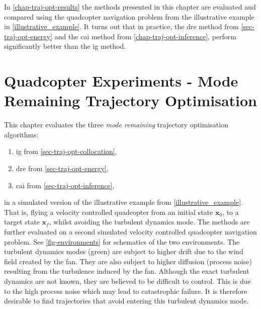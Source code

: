\documentclass{mimosis-class/mimosis}
\numberwithin{equation}{chapter}
\newcommand{\state}{\ensuremath{\mathbf{x}}}
\begin{document}
{In \cref{chap-traj-opt-results} the methods presented in this chapter are evaluated and compared using the
quadcopter navigation problem from the illustrative example in \cref{illustrative_example}.
It turns out that in practice, the \acrfull{dre} method from  \cref{sec-traj-opt-energy}
and the \acrfull{cai} method from \cref{chap-traj-opt-inference},
perform significantly better than the \acrfull{ig} method.

\chapter{Quadcopter Experiments - Mode Remaining Trajectory Optimisation \label{chap-traj-opt-results}}
\label{sec:orgc97a512}
\newcommand{\ig}{DELETEDELETE\xspace}
\newcommand{\dre}{DELETEDELETE\xspace}
\newcommand{\cai}{DELETEDELETE\xspace}
\newcommand{\deltaTime}{\ensuremath{\Delta \timeInd}}
\newcommand{\env}[1]{\ensuremath{\hat{#1}}}
\newcommand{\modeProbTraj}{\ensuremath{\Pr(\allModeVarK \mid \stateTraj)}}

\newcommand{\windDrift}[1]{\ensuremath{\bm\omega_{#1}}}
\newcommand{\windTurbulence}[1]{\ensuremath{\bm\epsilon_{#1}}}
\newcommand{\windTurbulenceNoise}[1]{\ensuremath{\bm\Sigma_{\windTurbulence{#1}}}}
This chapter evaluates the three \emph{mode remaining} trajectory optimisation algorithms:
\begin{enumerate}
\item \acrfull{ig} from \cref{sec-traj-opt-collocation},
\item \acrfull{dre} from \cref{sec-traj-opt-energy},
\item \acrfull{cai} from \cref{sec-traj-opt-inference},
\end{enumerate}
in a simulated version of the illustrative example from \cref{illustrative_example}.
That is, flying a velocity controlled quadcopter from an initial state \(\state_0\), to a target
state \(\state_{f}\), whilst avoiding the turbulent dynamics mode.
The methods are further evaluated on a second simulated velocity controlled quadcopter navigation problem.
See \cref{fig-environments} for schematics of the two environments.
The turbulent dynamics modes (green) are subject to higher drift due to the wind field created by the fan.
They are also subject to higher diffusion (process noise) resulting from the turbulence induced by the fan.
Although the exact turbulent dynamics are not known, they are believed to be difficult to control.
This is due to the high process noise which may lead to catastrophic failure.
It is therefore desirable to find trajectories that avoid entering this turbulent dynamics mode.

}
\end{document}
